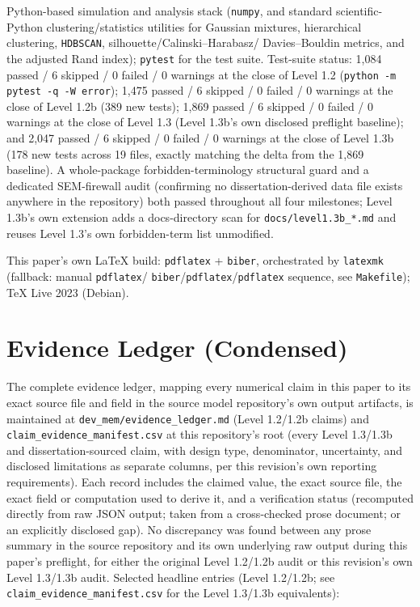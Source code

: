Python-based simulation and analysis stack (\texttt{numpy}, and standard
scientific-Python clustering/statistics utilities for Gaussian mixtures,
hierarchical clustering, \texttt{HDBSCAN}, silhouette/Calinski--Harabasz/
Davies--Bouldin metrics, and the adjusted Rand index); \texttt{pytest} for
the test suite. Test-suite status: 1,084 passed / 6 skipped / 0 failed / 0
warnings at the close of Level 1.2 (\texttt{python -m pytest -q -W
error}); 1,475 passed / 6 skipped / 0 failed / 0 warnings at the close of
Level 1.2b (389 new tests); 1,869 passed / 6 skipped / 0 failed / 0
warnings at the close of Level 1.3 (Level 1.3b's own disclosed preflight
baseline); and 2,047 passed / 6 skipped / 0 failed / 0 warnings at the
close of Level 1.3b (178 new tests across 19 files, exactly matching the
delta from the 1,869 baseline). A whole-package forbidden-terminology
structural guard and a dedicated SEM-firewall audit (confirming no
dissertation-derived data file exists anywhere in the repository) both
passed throughout all four milestones; Level 1.3b's own extension adds a
docs-directory scan for \texttt{docs/level1.3b\_*.md} and reuses Level
1.3's own forbidden-term list unmodified.

This paper's own \LaTeX{} build: \texttt{pdflatex} + \texttt{biber},
orchestrated by \texttt{latexmk} (fallback: manual \texttt{pdflatex}/
\texttt{biber}/\texttt{pdflatex}/\texttt{pdflatex} sequence, see
\texttt{Makefile}); TeX Live 2023 (Debian).

\clearpage
\section{Evidence Ledger (Condensed)}
\label{sec:appendix-ledger}

The complete evidence ledger, mapping every numerical claim in this paper
to its exact source file and field in the source model repository's own
output artifacts, is maintained at \texttt{dev\_mem/evidence\_ledger.md}
(Level 1.2/1.2b claims) and \texttt{claim\_evidence\_manifest.csv} at this
repository's root (every Level 1.3/1.3b and dissertation-sourced claim,
with design type, denominator, uncertainty, and disclosed limitations as
separate columns, per this revision's own reporting requirements). Each
record includes the claimed value, the exact source file, the exact field
or computation used to derive it, and a verification status (recomputed
directly from raw JSON output; taken from a cross-checked prose document;
or an explicitly disclosed gap). No discrepancy was found between any
prose summary in the source repository and its own underlying raw output
during this paper's preflight, for either the original Level 1.2/1.2b
audit or this revision's own Level 1.3/1.3b audit. Selected headline
entries (Level 1.2/1.2b; see \texttt{claim\_evidence\_manifest.csv} for the
Level 1.3/1.3b equivalents):

